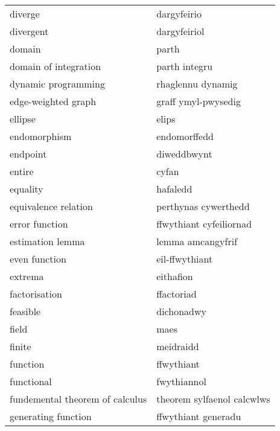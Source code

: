 \begin{supertabular}{p{0.22\textwidth}p{0.22\textwidth}}
                         diverge &                     dargyfeirio \\
                       divergent &                    dargyfeiriol \\
                          domain &                           parth \\
           domain of integration &                   parth integru \\
             dynamic programming &               rhaglennu dynamig \\
             edge-weighted graph &             graff ymyl-pwysedig \\
                         ellipse &                           elips \\
                    endomorphism &                    endomorffedd \\
                        endpoint &                     diweddbwynt \\
                          entire &                           cyfan \\
                        equality &                        hafaledd \\
            equivalence relation &            perthynas cywerthedd \\
                  error function &         ffwythiant cyfeiliornad \\
                estimation lemma &               lemma amcangyfrif \\
                   even function &                  eil-ffwythiant \\
                         extrema &                       eithafion \\
                   factorisation &                      ffactoriad \\
                        feasible &                      dichonadwy \\
                           field &                            maes \\
                          finite &                       meidraidd \\
                        function &                      ffwythiant \\
                      functional &                     fwythiannol \\
 fundemental theorem of calculus &      theorem sylfaenol calcwlws \\
             generating function &             ffwythiant generadu \\

\end{supertabular}

